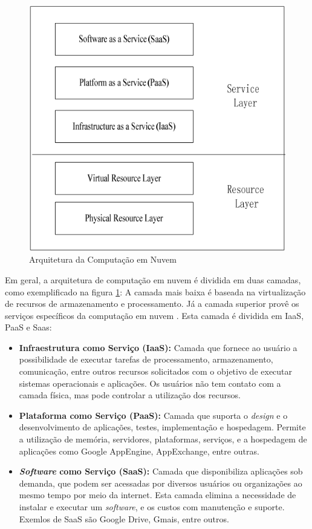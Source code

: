 \documentclass[12pt]{article}
\begin{document}
\begin{figure}[ht]
  \centering
  \includegraphics[scale= 0.5]{figuras/camadasCC.png}
  \caption{Arquitetura da Computação em Nuvem}
  \label{camadasCC}
\end{figure}

Em geral, a arquitetura de computação em nuvem é dividida em duas camadas, como
exemplificado na figura \ref{camadasCC}: A camada mais baixa é baseada na virtualização
de recursos de armazenamento e processamento. Já a camada superior provê os serviços
específicos da computação em nuvem \cite{jing2010}. Esta camada é dividida em IaaS, PaaS e Saas:

\begin{itemize}
  \item \textbf{Infraestrutura como Serviço (IaaS):} Camada que fornece ao usuário
  a possibilidade de executar tarefas de processamento, armazenamento, comunicação,
  entre outros recursos solicitados com o objetivo de executar sistemas operacionais e
  aplicações. Os usuários não tem contato com a camada física, mas pode controlar a
  utilização dos recursos.
  \item \textbf{Plataforma como Serviço (PaaS):} Camada que suporta o \textit{design}
  e o desenvolvimento de aplicações, testes, implementação e hospedagem. Permite
  a utilização de memória, servidores, plataformas, serviços, e a hospedagem de aplicações
  como Google AppEngine, AppExchange, entre outras.
  \item \textbf{\textit{Software} como Serviço (SaaS):} Camada que disponibiliza
  aplicações sob demanda, que podem ser acessadas por diversos usuários ou organizações
  ao mesmo tempo por meio da internet. Esta camada elimina a necessidade de instalar e
  executar um \textit{software}, e os custos com manutenção e suporte. Exemlos de SaaS são
  Google Drive, Gmais, entre outros.
\end{itemize}
\end{document}
